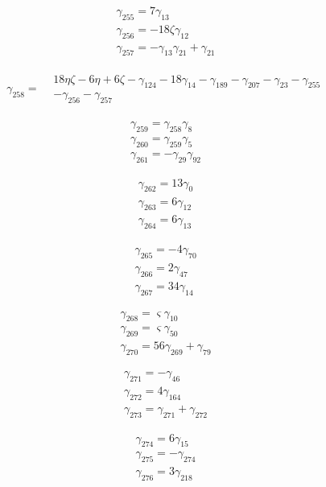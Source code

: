 \[\begin{aligned}\gamma_{255}=7 \gamma_{13}\\ \gamma_{256}=- 18 \zeta  \gamma_{12}\\ \gamma_{257}=- \gamma_{13} \gamma_{21} + \gamma_{21}\end{aligned}\]

\[\begin{aligned}\gamma_{258}=\begin{aligned}& 18 \eta  \zeta - 6 \eta + 6 \zeta - \gamma_{124}- 18 \gamma_{14}- \gamma_{189}- \gamma_{207}- \gamma_{23}- \gamma_{255}\\&- \gamma_{256}- \gamma_{257}\end{aligned}\end{aligned}\]

\[\begin{aligned}\gamma_{259}=\gamma_{258} \gamma_{8}\\ \gamma_{260}=\gamma_{259} \gamma_{5}\\ \gamma_{261}=- \gamma_{29} \gamma_{92}\end{aligned}\]

\[\begin{aligned}\gamma_{262}=13 \gamma_{0}\\ \gamma_{263}=6 \gamma_{12}\\ \gamma_{264}=6 \gamma_{13}\end{aligned}\]

\[\begin{aligned}\gamma_{265}=- 4 \gamma_{70}\\ \gamma_{266}=2 \gamma_{47}\\ \gamma_{267}=34 \gamma_{14}\end{aligned}\]

\[\begin{aligned}\gamma_{268}=\varsigma  \gamma_{10}\\ \gamma_{269}=\varsigma  \gamma_{50}\\ \gamma_{270}=56 \gamma_{269} + \gamma_{79}\end{aligned}\]

\[\begin{aligned}\gamma_{271}=- \gamma_{46}\\ \gamma_{272}=4 \gamma_{164}\\ \gamma_{273}=\gamma_{271} + \gamma_{272}\end{aligned}\]

\[\begin{aligned}\gamma_{274}=6 \gamma_{15}\\ \gamma_{275}=- \gamma_{274}\\ \gamma_{276}=3 \gamma_{218}\end{aligned}\]

